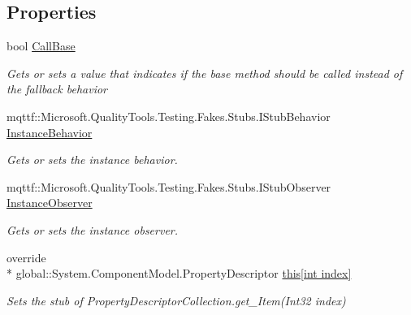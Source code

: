 \subsection*{Properties}
\begin{DoxyCompactItemize}
\item 
bool \hyperlink{class_system_1_1_component_model_1_1_fakes_1_1_stub_property_descriptor_collection_a948dfd20617794dd6223d97769e9a177}{Call\-Base}
\begin{DoxyCompactList}\small\item\em Gets or sets a value that indicates if the base method should be called instead of the fallback behavior\end{DoxyCompactList}\item 
mqttf\-::\-Microsoft.\-Quality\-Tools.\-Testing.\-Fakes.\-Stubs.\-I\-Stub\-Behavior \hyperlink{class_system_1_1_component_model_1_1_fakes_1_1_stub_property_descriptor_collection_a5ab84fc3292da4fa6cf9cfe213884a17}{Instance\-Behavior}
\begin{DoxyCompactList}\small\item\em Gets or sets the instance behavior.\end{DoxyCompactList}\item 
mqttf\-::\-Microsoft.\-Quality\-Tools.\-Testing.\-Fakes.\-Stubs.\-I\-Stub\-Observer \hyperlink{class_system_1_1_component_model_1_1_fakes_1_1_stub_property_descriptor_collection_aaf9ca88ba0aac3184ec5b3ccb8656d8b}{Instance\-Observer}
\begin{DoxyCompactList}\small\item\em Gets or sets the instance observer.\end{DoxyCompactList}\item 
override \\*
global\-::\-System.\-Component\-Model.\-Property\-Descriptor \hyperlink{class_system_1_1_component_model_1_1_fakes_1_1_stub_property_descriptor_collection_af6b1cc282977fe515490bd698ef99a65}{this\mbox{[}int index\mbox{]}}
\begin{DoxyCompactList}\small\item\em Sets the stub of Property\-Descriptor\-Collection.\-get\-\_\-\-Item(\-Int32 index)\end{DoxyCompactList}\item 

\end{DoxyCompactItemize}
